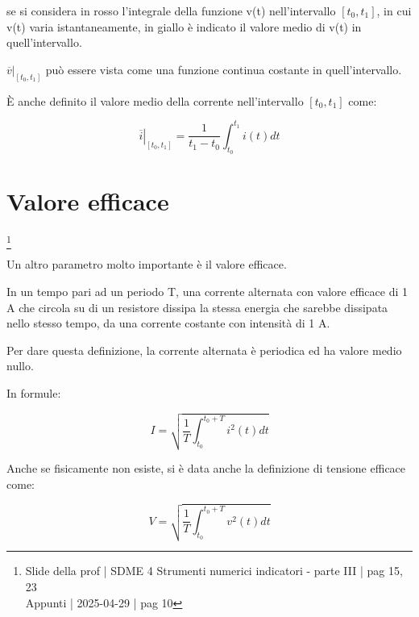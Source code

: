 se si considera in rosso l'integrale della funzione v(t) nell'intervallo $[t_0, t_1]$, 
in cui v(t) varia istantaneamente, 
in giallo è indicato il valore medio di v(t) in quell'intervallo. \newline 

$ \left. \overline{v} \right|_{[t_0, t_1]}$ può essere vista come una funzione continua costante in quell'intervallo. \newline 

È anche definito il valore medio della corrente nell'intervallo $[t_0, t_1]$ come: 

{
    \Large 
    \begin{equation}
        \left. \overline{i} \right|_{[t_0, t_1]} 
        = 
        \frac{1}{t_1 - t_0}
        \int_{t_0}^{t_1} 
        i(t) dt
    \end{equation}
}

\newpage 

\section{Valore efficace}
\footnote{Slide della prof | SDME 4 Strumenti numerici indicatori - parte III | pag  15, 23 \\  
Appunti | 2025-04-29 | pag 10} 

Un altro parametro molto importante è il valore efficace. \newline 

In un tempo pari ad un periodo T, una corrente alternata con valore efficace di 1 A che circola su di un resistore 
dissipa la stessa energia che sarebbe dissipata nello stesso tempo, da una corrente costante con intensità di 1 A. \newline 

Per dare questa definizione, la corrente alternata è periodica ed ha valore medio nullo. \newline 

In formule: 

{
    \Large 
    \begin{equation}
        I 
        = 
        \sqrt
        {
            \frac{1}{T}
            \int_{t_0}^{t_0 + T} 
            i^{2} (t) dt
        }
    \end{equation}
}

Anche se fisicamente non esiste, 
si è data anche la definizione di tensione efficace come: 

{
    \Large 
    \begin{equation}
        V 
        = 
        \sqrt
        {
            \frac{1}{T}
            \int_{t_0}^{t_0 + T} 
            v^{2} (t) dt
        }
    \end{equation}
}

